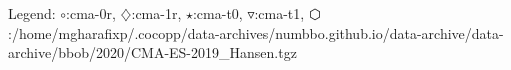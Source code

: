 Legend: {\color{NavyBlue}$\circ$}:cma-0r, {\color{Magenta}$\diamondsuit$}:cma-1r, {\color{Orange}$\star$}:cma-t0, {\color{CornflowerBlue}$\triangledown$}:cma-t1, {\color{red}$\varhexagon$}:/home/mgharafixp/.cocopp/data-archives/numbbo.github.io/data-archive/data-archive/bbob/2020/CMA-ES-2019\_Hansen.tgz